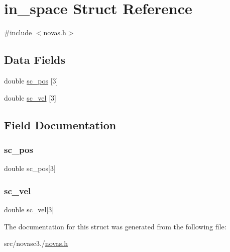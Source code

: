 \hypertarget{structin__space}{}\section{in\+\_\+space Struct Reference}
\label{structin__space}


{\ttfamily \#include $<$novas.\+h$>$}

\subsection*{Data Fields}
\begin{DoxyCompactItemize}
\item 
double \mbox{\hyperlink{structin__space_abc3736b39d63bfabf73a25e3b03b91d8}{sc\+\_\+pos}} \mbox{[}3\mbox{]}
\item 
double \mbox{\hyperlink{structin__space_a9615dabeef0c31f47546c8083b768257}{sc\+\_\+vel}} \mbox{[}3\mbox{]}
\end{DoxyCompactItemize}


\subsection{Field Documentation}
\mbox{\label{structin__space_abc3736b39d63bfabf73a25e3b03b91d8}} 
\subsubsection{\texorpdfstring{sc\+\_\+pos}{sc\_pos}}
{\footnotesize\ttfamily double sc\+\_\+pos\mbox{[}3\mbox{]}}

\mbox{\label{structin__space_a9615dabeef0c31f47546c8083b768257}} 
\subsubsection{\texorpdfstring{sc\+\_\+vel}{sc\_vel}}
{\footnotesize\ttfamily double sc\+\_\+vel\mbox{[}3\mbox{]}}



The documentation for this struct was generated from the following file\+:\begin{DoxyCompactItemize}
\item 
src/novasc3./\mbox{\hyperlink{novas_8h}{novas.\+h}}\end{DoxyCompactItemize}
